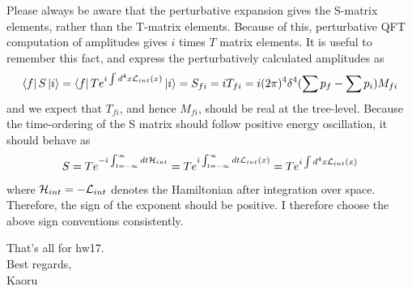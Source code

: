 \documentclass[12pt]{article}
\begin{document}
  Please always be aware that the perturbative expansion gives the
  S-matrix elements, rather than the T-matrix elements.  Because of this,
  perturbative QFT computation of amplitudes gives $i$ times $T$ matrix
  elements. It is useful to remember this fact, and express the
  perturbatively calculated amplitudes as
\begin{eqnarray}
  \bra{f} S \ket{i} =  \bra{f} T e^{ i\int d^4x {\cal L}_{int}(x) } \ket{i} =   S_{fi}
  = i T_{fi}
  = i (2\pi)^4 \delta^4(\sum p_f - \sum p_i) M_{fi} \label{eq.17_53}
\end{eqnarray}
 and we expect that $T_{fi}$, and hence $M_{fi}$, should be real at the
  tree-level.
  Because the time-ordering of the S matrix should follow positive energy
  oscillation, it should behave as
\begin{eqnarray}
  S = T e^{ -i \int_{t=-\infty}^{\infty} dt {\cal H}_{int} }
        = T e^{  i \int_{t=-\infty}^{\infty} dt {\cal L}_{int}(x) }
        = T e^{  i \int d^4x  {\cal L}_{int}(x) } \label{eq.17_54}
\end{eqnarray}
  where ${\cal H}_{int} = -{\cal L}_{int}$ denotes the Hamiltonian after integration over
  space. Therefore, the sign of the exponent should be positive.
  I therefore choose the above sign conventions consistently.

  That's all for hw17.\\

Best regards,\\

Kaoru
\end{document}
